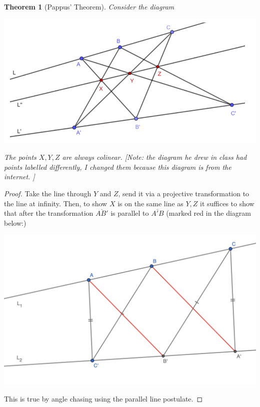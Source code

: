 \documentclass[12pt]{article}
\newtheorem{theorem}{Theorem}
\begin{document}
    \begin{theorem}
        [Pappus' Theorem] Consider the diagram 
        \begin{center}
            \includegraphics[width = 0.7\linewidth]{pappus.png}
        \end{center} 
        The points $X, Y, Z$ are always colinear. [Note: the diagram he drew in class had points labelled differently, I changed them because this diagram is from the internet. ]
    \end{theorem}
    \begin{proof}
        Take the line through $Y$ and $Z$, send it via a projective transformation to the line at infinity. Then, to show $X$ is on the same line as $Y, Z$ it suffices to show that after the transformation $\overline{AB'}$ is parallel to $\overline{A'B}$ (marked red in the diagram below:)
        \begin{center}
            \includegraphics[width = 0.8\linewidth]{pappus_step_2.png}
        \end{center} 
        This is true by angle chasing using the parallel line postulate.  
    \end{proof}
\end{document}

